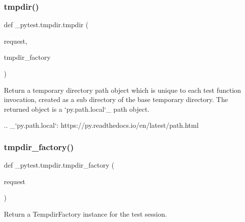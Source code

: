 \subsubsection{\texorpdfstring{tmpdir()}{tmpdir()}}
{\footnotesize\ttfamily def \+\_\+pytest.\+tmpdir.\+tmpdir (\begin{DoxyParamCaption}\item[{}]{request,  }\item[{}]{tmpdir\+\_\+factory }\end{DoxyParamCaption})}

\begin{DoxyVerb}Return a temporary directory path object
which is unique to each test function invocation,
created as a sub directory of the base temporary
directory.  The returned object is a `py.path.local`_
path object.

.. _`py.path.local`: https://py.readthedocs.io/en/latest/path.html
\end{DoxyVerb}
 \mbox{\label{namespace__pytest_1_1tmpdir_aaeb6f2c894e9b7f25d475f96a8d1d247}} 
\subsubsection{\texorpdfstring{tmpdir\+\_\+factory()}{tmpdir\_factory()}}
{\footnotesize\ttfamily def \+\_\+pytest.\+tmpdir.\+tmpdir\+\_\+factory (\begin{DoxyParamCaption}\item[{}]{request }\end{DoxyParamCaption})}

\begin{DoxyVerb}Return a TempdirFactory instance for the test session.
\end{DoxyVerb}
 